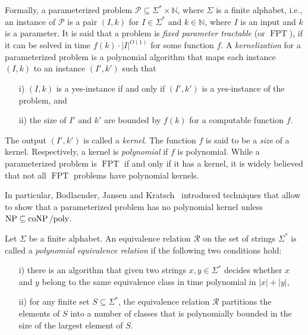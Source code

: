 \documentclass[11pt]{article}
\DeclareMathOperator{\operatorClassNP}{NP}
\newcommand{\classNP}{\ensuremath{\operatorClassNP}}
\DeclareMathOperator{\operatorClassCoNP}{coNP}
\newcommand{\classCoNP}{\ensuremath{\operatorClassCoNP}}
\DeclareMathOperator{\operatorClassFPT}{FPT}
\newcommand{\classFPT}{\ensuremath{\operatorClassFPT}}
\begin{document}
Formally, a parameterized problem $\mathcal{P}\subseteq\Sigma^*\times\mathbb{N}$, where $\Sigma$ is a finite alphabet, i.e., an instance of $\mathcal{P}$ is a pair $(I,k)$ for $I\in \Sigma^*$ and $k\in\mathbb{N}$, where $I$ is an input and $k$ is a parameter.
It is said that a problem is \emph{fixed parameter tractable} (or \classFPT), if it can be solved in time $f(k)\cdot |I|^{O(1)}$ for some function $f$. 
A \emph{kernelization} for a parameterized problem is a polynomial algorithm that maps each instance $(I,k)$  to an instance $(I',k')$ such that 
\begin{itemize}
\item[i)] $(I,k)$ is a yes-instance if and only if $(I',k')$ is a yes-instance of the problem, and
\item[ii)] the size of $I'$ and $k'$ are bounded by $f(k)$ for a computable function $f$. 
\end{itemize}
The output $(I',k')$ is called a \emph{kernel}. The function $f$ is said to be a \emph{size} of a kernel. Respectively, a kernel is \emph{polynomial} if $f$ is polynomial. 
While a parameterized problem is \classFPT{} if and only if it has a kernel, it is widely believed that not all \classFPT{} problems have polynomial kernels.

 In particular, Bodlaender, Jansen and Kratsch~\cite{BodlaenderJK14} introduced techniques that allow to show that a parameterized problem has no polynomial kernel unless  $\classNP\subseteq\classCoNP/\text{\rm poly}$.


Let $\Sigma$ be a finite alphabet. An equivalence relation $\mathcal{R}$ on the set of strings $\Sigma^*$ is called a \emph{polynomial equivalence relation} if the following two conditions hold:
\begin{itemize}
\item[i)] there is an algorithm that given two strings $x,y\in\Sigma^*$ decides whether $x$ and $y$ belong to
the same equivalence class in time polynomial in $|x|+|y|$,
\item[ii)] for any finite set $S\subseteq\Sigma^*$, the equivalence relation $\mathcal{R}$ partitions the elements of $S$ into a
number of classes that is polynomially bounded in the size of the largest element of $S$.
\end{itemize}
\end{document}
